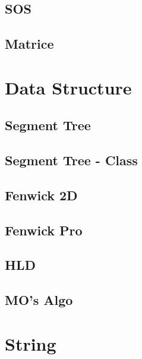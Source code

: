 \subsection{SOS}
\raggedbottom
\subsection{Matrice}
\raggedbottom
\hrulefill


\section{Data Structure}
\subsection{Segment Tree}
\raggedbottom
\subsection{Segment Tree - Class}
\raggedbottom
\subsection{Fenwick 2D}
\raggedbottom
\subsection{Fenwick Pro}
\raggedbottom
\subsection{HLD}
\raggedbottom
\subsection{MO's Algo}
\raggedbottom
\hrulefill

\section{String}
